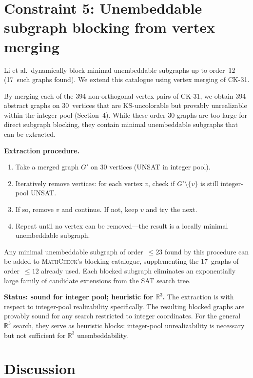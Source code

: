 \documentclass[twocolumn,prl,superscriptaddress,nofootinbib]{revtex4-2}
\newcommand{\R}{\mathbb{R}}
\begin{document}
\section{Constraint 5: Unembeddable subgraph blocking from vertex merging}
\label{sec:merging}

Li et al.\ dynamically block minimal unembeddable subgraphs up to order~12 (17~such graphs found).  We extend this catalogue using vertex merging of CK-31.

By merging each of the 394 non-orthogonal vertex pairs of CK-31, we obtain 394 abstract graphs on 30~vertices that are KS-uncolorable but provably unrealizable within the integer pool (Section~4).  While these order-30 graphs are too large for direct subgraph blocking, they contain minimal unembeddable subgraphs that can be extracted.

\medskip
\noindent\textbf{Extraction procedure.}
\begin{enumerate}
\item Take a merged graph $G'$ on 30 vertices (UNSAT in integer pool).
\item Iteratively remove vertices: for each vertex $v$, check if $G' \setminus \{v\}$ is still integer-pool UNSAT.
\item If so, remove $v$ and continue.  If not, keep $v$ and try the next.
\item Repeat until no vertex can be removed---the result is a locally minimal unembeddable subgraph.
\end{enumerate}

Any minimal unembeddable subgraph of order~$\leq 23$ found by this procedure can be added to \textsc{MathCheck}'s blocking catalogue, supplementing the 17~graphs of order~$\leq 12$ already used.  Each blocked subgraph eliminates an exponentially large family of candidate extensions from the SAT search tree.

\textbf{Status: sound for integer pool; heuristic for $\R^3$.}  The extraction is with respect to integer-pool realizability specifically.  The resulting blocked graphs are provably sound for any search restricted to integer coordinates.  For the general $\R^3$ search, they serve as heuristic blocks: integer-pool unrealizability is necessary but not sufficient for $\R^3$ unembeddability.

\section{Discussion}
\end{document}
